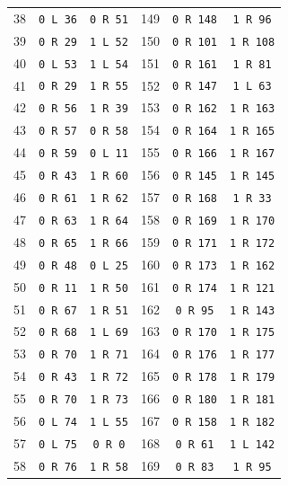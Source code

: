 \begin{longtable}{@{}rcc@{\hspace{14mm}}rcc@{}}
38 & \texttt{0 L 36} & \texttt{0 R 51} & 149 & \texttt{0 R 148} & \texttt{1 R 96}\\
39 & \texttt{0 R 29} & \texttt{1 L 52} & 150 & \texttt{0 R 101} & \texttt{1 R 108}\\
40 & \texttt{0 L 53} & \texttt{1 L 54} & 151 & \texttt{0 R 161} & \texttt{1 R 81}\\
41 & \texttt{0 R 29} & \texttt{1 R 55} & 152 & \texttt{0 R 147} & \texttt{1 L 63}\\
42 & \texttt{0 R 56} & \texttt{1 R 39} & 153 & \texttt{0 R 162} & \texttt{1 R 163}\\
43 & \texttt{0 R 57} & \texttt{0 R 58} & 154 & \texttt{0 R 164} & \texttt{1 R 165}\\
44 & \texttt{0 R 59} & \texttt{0 L 11} & 155 & \texttt{0 R 166} & \texttt{1 R 167}\\
45 & \texttt{0 R 43} & \texttt{1 R 60} & 156 & \texttt{0 R 145} & \texttt{1 R 145}\\
46 & \texttt{0 R 61} & \texttt{1 R 62} & 157 & \texttt{0 R 168} & \texttt{1 R 33}\\
47 & \texttt{0 R 63} & \texttt{1 R 64} & 158 & \texttt{0 R 169} & \texttt{1 R 170}\\
48 & \texttt{0 R 65} & \texttt{1 R 66} & 159 & \texttt{0 R 171} & \texttt{1 R 172}\\
49 & \texttt{0 R 48} & \texttt{0 L 25} & 160 & \texttt{0 R 173} & \texttt{1 R 162}\\
50 & \texttt{0 R 11} & \texttt{1 R 50} & 161 & \texttt{0 R 174} & \texttt{1 R 121}\\
51 & \texttt{0 R 67} & \texttt{1 R 51} & 162 & \texttt{0 R 95} & \texttt{1 R 143}\\
52 & \texttt{0 R 68} & \texttt{1 L 69} & 163 & \texttt{0 R 170} & \texttt{1 R 175}\\
53 & \texttt{0 R 70} & \texttt{1 R 71} & 164 & \texttt{0 R 176} & \texttt{1 R 177}\\
54 & \texttt{0 R 43} & \texttt{1 R 72} & 165 & \texttt{0 R 178} & \texttt{1 R 179}\\
55 & \texttt{0 R 70} & \texttt{1 R 73} & 166 & \texttt{0 R 180} & \texttt{1 R 181}\\
56 & \texttt{0 L 74} & \texttt{1 L 55} & 167 & \texttt{0 R 158} & \texttt{1 R 182}\\
57 & \texttt{0 L 75} & \texttt{0 R 0} & 168 & \texttt{0 R 61} & \texttt{1 L 142}\\
58 & \texttt{0 R 76} & \texttt{1 R 58} & 169 & \texttt{0 R 83} & \texttt{1 R 95}\\

\end{longtable}
